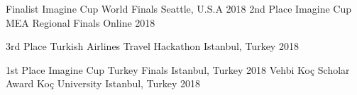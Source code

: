 
\vspace*{-1.5mm}

\vspace*{-1.5mm}

\begin{cvhonors}

  \cvhonor
    {Finalist}%
    {Imagine Cup World Finals}%
    {Seattle, U.S.A}%
    {2018}%
  \cvhonor
    {2nd Place}
    {Imagine Cup MEA Regional Finals} %
    {Online}
    {2018}
\end{cvhonors}


\vspace*{-1.5mm}

\begin{cvhonors}

  \cvhonor
    {3rd Place}
    {Turkish Airlines Travel Hackathon}
    {Istanbul, Turkey}
    {2018}

   \cvhonor
    {1st Place}
    {Imagine Cup Turkey Finals}
    {Istanbul, Turkey}
    {2018}
  \cvhonor
    {Vehbi Koç Scholar Award}
    {Koç University}
    {Istanbul, Turkey}
    {2018}

\end{cvhonors}
